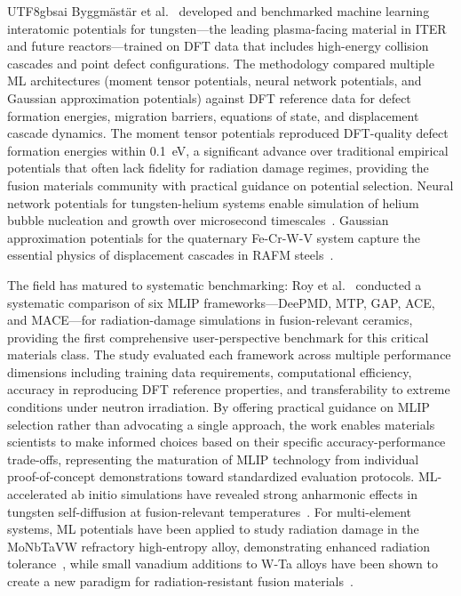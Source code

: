 \documentclass[12pt,a4paper]{article}
\begin{document}
\begin{CJK}{UTF8}{gbsai}
Byggm\"{a}st\"{a}r et al.~\citep{Byggmastar2024} developed and benchmarked machine learning interatomic potentials for tungsten---the leading plasma-facing material in ITER and future reactors---trained on DFT data that includes high-energy collision cascades and point defect configurations. The methodology compared multiple ML architectures (moment tensor potentials, neural network potentials, and Gaussian approximation potentials) against DFT reference data for defect formation energies, migration barriers, equations of state, and displacement cascade dynamics. The moment tensor potentials reproduced DFT-quality defect formation energies within 0.1~eV, a significant advance over traditional empirical potentials that often lack fidelity for radiation damage regimes, providing the fusion materials community with practical guidance on potential selection. Neural network potentials for tungsten-helium systems enable simulation of helium bubble nucleation and growth over microsecond timescales~\citep{Ghafarollahi2024}. Gaussian approximation potentials for the quaternary Fe-Cr-W-V system capture the essential physics of displacement cascades in RAFM steels~\citep{Mianowska2024}.

The field has matured to systematic benchmarking: Roy et al.~\citep{Roy2026MLIP} conducted a systematic comparison of six MLIP frameworks---DeePMD, MTP, GAP, ACE, and MACE---for radiation-damage simulations in fusion-relevant ceramics, providing the first comprehensive user-perspective benchmark for this critical materials class. The study evaluated each framework across multiple performance dimensions including training data requirements, computational efficiency, accuracy in reproducing DFT reference properties, and transferability to extreme conditions under neutron irradiation. By offering practical guidance on MLIP selection rather than advocating a single approach, the work enables materials scientists to make informed choices based on their specific accuracy-performance trade-offs, representing the maturation of MLIP technology from individual proof-of-concept demonstrations toward standardized evaluation protocols. ML-accelerated ab initio simulations have revealed strong anharmonic effects in tungsten self-diffusion at fusion-relevant temperatures~\citep{Anharmonic2025}. For multi-element systems, ML potentials have been applied to study radiation damage in the MoNbTaVW refractory high-entropy alloy, demonstrating enhanced radiation tolerance~\citep{RHEA2025}, while small vanadium additions to W-Ta alloys have been shown to create a new paradigm for radiation-resistant fusion materials~\citep{Tunes2025}.


\end{CJK}
\end{document}
